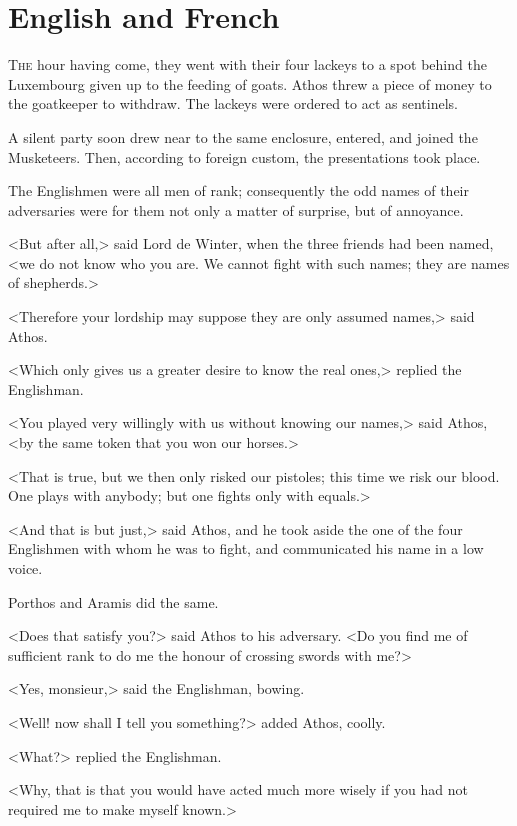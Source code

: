 
\chapter{English and French}

\lettrine[]{T}{he} hour having come, they went with their four lackeys to a spot behind the Luxembourg given up to the feeding of goats. Athos threw a piece of money to the goatkeeper to withdraw. The lackeys were ordered to act as sentinels. 

A silent party soon drew near to the same enclosure, entered, and joined the Musketeers. Then, according to foreign custom, the presentations took place. 

The Englishmen were all men of rank; consequently the odd names of their adversaries were for them not only a matter of surprise, but of annoyance. 

<But after all,> said Lord de Winter, when the three friends had been named, <we do not know who you are. We cannot fight with such names; they are names of shepherds.> 

<Therefore your lordship may suppose they are only assumed names,> said Athos. 

<Which only gives us a greater desire to know the real ones,> replied the Englishman. 

<You played very willingly with us without knowing our names,> said Athos, <by the same token that you won our horses.> 

<That is true, but we then only risked our pistoles; this time we risk our blood. One plays with anybody; but one fights only with equals.> 

<And that is but just,> said Athos, and he took aside the one of the four Englishmen with whom he was to fight, and communicated his name in a low voice. 

Porthos and Aramis did the same. 

<Does that satisfy you?> said Athos to his adversary. <Do you find me of sufficient rank to do me the honour of crossing swords with me?> 

<Yes, monsieur,> said the Englishman, bowing. 

<Well! now shall I tell you something?> added Athos, coolly. 

<What?> replied the Englishman. 

<Why, that is that you would have acted much more wisely if you had not required me to make myself known.> 

